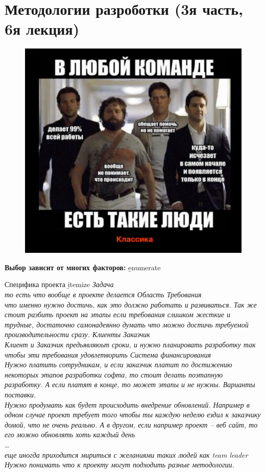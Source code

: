 \documentclass[12pt; a4paper]{book}
\theoremstyle{plain} %
\theoremstyle{defenition}
\theoremstyle{remark}
\begin{document}
\section{Методологии разроботки (3я часть,  6я лекция)}
\begin{figure}[!htbp]
\includegraphics[angle=0, width=\textwidth]{IMG/10} \\
\end{figure}

\textbf{Выбор зависит от многих факторов:}
\b{enumerate}
\item Специфика проекта
    \b{itemize}
    \it Задача\\
    {\normalsize то есть что вообще в проекте делается}
    \it Область
    \it Требования\\
    {\normalsize что именно нужно достичь, как это должно работать и развиваться. Так же стоит разбить проект на этапы если требования слишком жесткие и трудные, достаточно самонадеянно думать что можно достичь требуемой производительности сразу.}
    \it Клиенты
    \it Заказчик\\
    {\normalsize Клиент и Заказчик предьявляюьт сроки, и нужно планировать разработку так чтобы эти требования удовлетворить}
\it Система финансирования\\
{\normalsize Нужно платить сотрудникам, и если заказчик платит по достижению некоторых этапов разработки софта, то стоит делать поэтапную разработку. А если платят в конце, то может этапы и не нужны.}
\it Варианты поставки.\\
{\normalsize Нужно продумать как будет происходить внедрение обновлений. Например в одном случае проект требует того чтобы ты каждую неделю ездил к заказчику
домой, что не очень реально. А в другом, если например проект -- веб сайт, то его можно обновлять 
хоть каждый день}\\
\it \ldots\\ 
{\normalsize еще иногда приходится мириться с желаниями таких людей как team leader}
Нужно понимать что к проекту могут подходить разные методологии.
\end{document}
